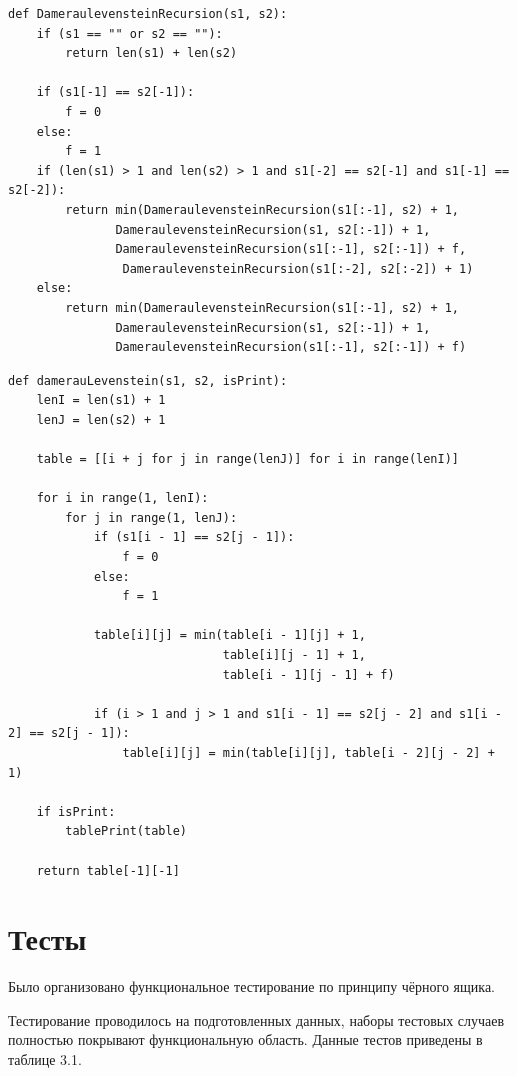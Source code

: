 \documentclass[12pt]{report}
\begin{document}
\begin{lstlisting}[label=some-code,caption=Функция нахождения расстояния Дамерау-Левенштейна рекурсивно]
def DameraulevensteinRecursion(s1, s2):
    if (s1 == "" or s2 == ""):
        return len(s1) + len(s2)

    if (s1[-1] == s2[-1]): 
        f = 0 
    else: 
        f = 1
    if (len(s1) > 1 and len(s2) > 1 and s1[-2] == s2[-1] and s1[-1] == s2[-2]):
        return min(DameraulevensteinRecursion(s1[:-1], s2) + 1,
               DameraulevensteinRecursion(s1, s2[:-1]) + 1,
               DameraulevensteinRecursion(s1[:-1], s2[:-1]) + f,
                DameraulevensteinRecursion(s1[:-2], s2[:-2]) + 1)
    else:
        return min(DameraulevensteinRecursion(s1[:-1], s2) + 1,
               DameraulevensteinRecursion(s1, s2[:-1]) + 1,
               DameraulevensteinRecursion(s1[:-1], s2[:-1]) + f)
\end{lstlisting}

\begin{lstlisting}[label=some-code,caption=Функция нахождения расстояния Дамерау-Левенштейна матрично]
def damerauLevenstein(s1, s2, isPrint):
    lenI = len(s1) + 1
    lenJ = len(s2) + 1
    
    table = [[i + j for j in range(lenJ)] for i in range(lenI)]

    for i in range(1, lenI):
        for j in range(1, lenJ):
            if (s1[i - 1] == s2[j - 1]):
                f = 0
            else:
                f = 1
            
            table[i][j] = min(table[i - 1][j] + 1,
                              table[i][j - 1] + 1,
                              table[i - 1][j - 1] + f)
            
            if (i > 1 and j > 1 and s1[i - 1] == s2[j - 2] and s1[i - 2] == s2[j - 1]):
                table[i][j] = min(table[i][j], table[i - 2][j - 2] + 1)

    if isPrint:
        tablePrint(table)
    
    return table[-1][-1]
\end{lstlisting}

\section{Тесты}
Было организовано функциональное тестирование по принципу чёрного ящика.

Тестирование проводилось на подготовленных данных, наборы тестовых случаев полностью покрывают функциональную область. Данные тестов приведены в таблице 3.1.
\end{document}
